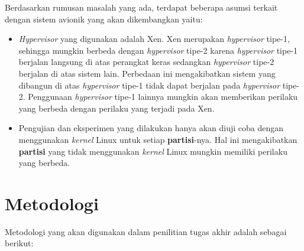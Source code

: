 Berdasarkan rumusan masalah yang ada, terdapat beberapa asumsi terkait dengan sistem avionik yang akan dikembangkan yaitu:

\begin{itemize}

    \item \textit{Hypervisor} yang digunakan adalah Xen.  Xen merupakan \textit{hypervisor} tipe-1, sehingga mungkin berbeda dengan \textit{hypervisor} tipe-2 karena \textit{hypervisor} tipe-1 berjalan langsung di atas perangkat keras sedangkan \textit{hypervisor} tipe-2 berjalan di atas sistem lain.
        Perbedaan ini mengakibatkan sistem yang dibangun di atas \textit{hypervisor} tipe-1 tidak dapat berjalan pada \textit{hypervisor} tipe-2.
        Penggunaan \textit{hypervisor} tipe-1 lainnya mungkin akan memberikan perilaku yang berbeda dengan perilaku yang terjadi pada Xen.


    \item Pengujian dan eksperimen yang dilakukan hanya akan diuji coba dengan menggunakan \textit{kernel} Linux untuk setiap \textbf{partisi}-nya.
        Hal ini mengakibatkan \textbf{partisi} yang tidak menggunakan \textit{kernel} Linux mungkin memiliki perilaku yang berbeda.


\end{itemize}

\section{Metodologi}

Metodologi yang akan digunakan dalam penilitian tugas akhir adalah sebagai berikut:

